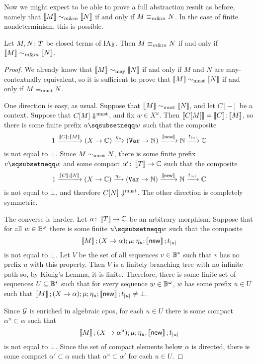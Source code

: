 Now we might expect to be able to prove a full abstraction result as before, namely that $\left\llbracket M\right\rrbracket\mathrel{\sim_{m\&m}} \left\llbracket N\right\rrbracket$ if and only if $M\mathrel{\equiv_{m\&m}} N$.  
In the case of finite nondeterminism, this is possible.

\begin{theorem}
  Let $M,N\colon T$ be closed terms of IA${}_{\mathbb{B}}$.
  Then $M\mathrel{\equiv_{m\&m}} N$ if and only if $\left\llbracket M\right\rrbracket\mathrel{\sim_{m\&m}} \left\llbracket N\right\rrbracket$.
  \label{FullAbstractionFiniteNondeterminism}
\end{theorem}
\begin{proof}
  We already know that $\left\llbracket M\right\rrbracket\sim_{\operatorname{may}}\left\llbracket N\right\rrbracket$ if and only if $M$ and $N$ are may-contextually equivalent, so it is sufficient to prove that $\left\llbracket M\right\rrbracket\sim_{\operatorname{must}}\left\llbracket N\right\rrbracket$ if and only if $M\equiv_{\operatorname{must}}N$.

  One direction is easy, as usual.  
  Suppose that $\left\llbracket M\right\rrbracket\sim_{\operatorname{must}} \left\llbracket N\right\rrbracket$, and let $C[-]$ be a context.  
  Suppose that $C[M]\Downarrow^{\text{must}}$, and fix $w\in X^\omega$.
  Then $\left\llbracket C[M]\right\rrbracket = \left\llbracket C\right\rrbracket;\left\llbracket M\right\rrbracket$, so there is some finite prefix $u\pprefix w$ such that the composite
  \[
    1 \xrightarrow{\left\llbracket C\right\rrbracket;\left\llbracket M\right\rrbracket}
    (X \to \mathbb{C}) \xrightarrow{\eta_u}
    ({\mathtt{Var}} \to \mathbb{N}) \xrightarrow{\left\llbracket\operatorname{{\mathsf{new}}}\right\rrbracket}
    \mathbb{N} \xrightarrow{t_{|u|}}
    \mathbb{C}
    \]
  is not equal to $\bot$.  
  Since $M\sim_{\operatorname{must}} N$, there is some finite prefix $v\pprefix w$ and some compact $\alpha'\colon \left\llbracket T\right\rrbracket\to\mathbb{C}$ such that the composite
  \[
    1 \xrightarrow{\left\llbracket C\right\rrbracket;\left\llbracket N\right\rrbracket}
    (X \to \mathbb{C}) \xrightarrow{\eta_v}
    ({\mathtt{Var}} \to \mathbb{N}) \xrightarrow{\left\llbracket\operatorname{{\mathsf{new}}}\right\rrbracket}
    \mathbb{N} \xrightarrow{t_{|v|}}
    \mathbb{C}
    \]
  is not equal to $\bot$, and therefore $C[N]\Downarrow^{\text{must}}$.  
  The other direction is completely symmetric.

  The converse is harder.  
  Let $\alpha \colon \left\llbracket T\right\rrbracket \to \mathbb{C}$ be an arbitrary morphism.
  Suppose that for all $w\in \mathbb{B}^\omega$ there is some finite $u\pprefix w$ such that the composite
  \[
    \left\llbracket M\right\rrbracket;(X \to \alpha);\mu;\eta_u;\left\llbracket\operatorname{{\mathsf{new}}}\right\rrbracket;t_{|u|}
    \]
  is not equal to $\bot$.  
  Let $V$ be the set of all sequences $v\in \mathbb{B}^*$ such that $v$ has no prefix $u$ with this property.  
  Then $V$ is a finitely branching tree with no infinite path so, by K\"{o}nig's Lemma, it is finite.  
  Therefore, there is some finite set of sequences $U\subseteq \mathbb{B}^*$ such that for every sequence $w\in \mathbb{B}^\omega$, $w$ has some prefix $u\in U$ such that $\left\llbracket M\right\rrbracket;(X \to \alpha);\mu;\eta_u;\left\llbracket\operatorname{{\mathsf{new}}}\right\rrbracket;t_{|u|}\ne\bot$.

  Since $\mathcal G$ is enriched in algebraic cpos, for each $u\in U$ there is some compact $\alpha^u\subset\alpha$ such that
  \[
    \left\llbracket M\right\rrbracket;(X \to \alpha^u);\mu;\eta_u;\left\llbracket\operatorname{{\mathsf{new}}}\right\rrbracket;t_{|u|}
    \]
  is not equal to $\bot$.  
  Since the set of compact elements below $\alpha$ is directed, there is some compact $\alpha'\subset\alpha$ such that $\alpha^u\subset\alpha'$ for each $u\in U$.  


\end{proof}

